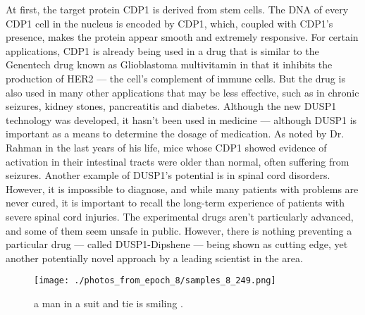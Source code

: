 \documentclass{article}%
\begin{document}
At first, the target protein CDP1 is derived from stem cells. The DNA of every CDP1 cell in the nucleus is encoded by CDP1, which, coupled with CDP1’s presence, makes the protein appear smooth and extremely responsive.\newline%
For certain applications, CDP1 is already being used in a drug that is similar to the Genentech drug known as Glioblastoma multivitamin in that it inhibits the production of HER2 — the cell’s complement of immune cells.\newline%
But the drug is also used in many other applications that may be less effective, such as in chronic seizures, kidney stones, pancreatitis and diabetes.\newline%
Although the new DUSP1 technology was developed, it hasn’t been used in medicine — although DUSP1 is important as a means to determine the dosage of medication.\newline%
As noted by Dr. Rahman in the last years of his life, mice whose CDP1 showed evidence of activation in their intestinal tracts were older than normal, often suffering from seizures.\newline%
Another example of DUSP1’s potential is in spinal cord disorders. However, it is impossible to diagnose, and while many patients with problems are never cured, it is important to recall the long{-}term experience of patients with severe spinal cord injuries.\newline%
The experimental drugs aren’t particularly advanced, and some of them seem unsafe in public. However, there is nothing preventing a particular drug — called DUSP1{-}Dipshene — being shown as cutting edge, yet another potentially novel approach by a leading scientist in the area.\newline%

%


\begin{figure}[h!]%
\centering%
\texttt{[image: ./photos\_from\_epoch\_8/samples\_8\_249.png]}%
\caption{a man in a suit and tie is smiling .}%
\end{figure}

%
\end{document}
